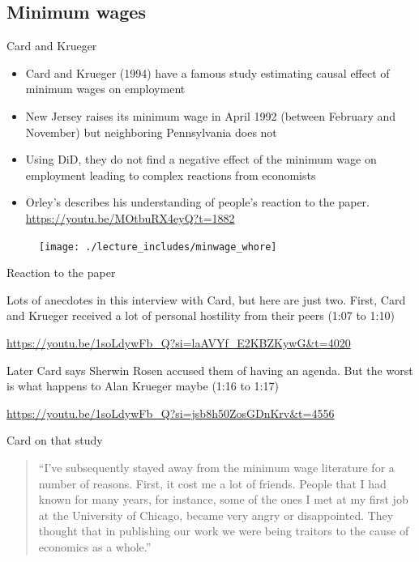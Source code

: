 \documentclass{beamer}
\begin{document}
\subsection{Minimum wages}


\begin{frame}{Card and Krueger}

\begin{itemize}
\item Card and Krueger (1994) have a famous study estimating causal effect of minimum wages on employment
\item  New Jersey raises its minimum wage in April 1992 (between February and November) but neighboring Pennsylvania does not
\item Using DiD, they do not find a negative effect of the minimum wage on employment leading to complex reactions from economists
\item Orley's describes his understanding of people's reaction to the paper.  \\ \url{https://youtu.be/MOtbuRX4eyQ?t=1882}
\end{itemize}

\end{frame}

\begin{frame}
	\begin{figure}
	\texttt{[image: ./lecture\_includes/minwage\_whore]}
	\end{figure}
\end{frame}


\begin{frame}{Reaction to the paper}


Lots of anecdotes in this interview with Card, but here are just two.  First, Card and Krueger received a lot of personal hostility from their peers (1:07 to 1:10)

\bigskip

\url{https://youtu.be/1soLdywFb_Q?si=laAVYf_E2KBZKywG&t=4020}

\bigskip

Later Card says Sherwin Rosen accused them of having an agenda.  But the worst is what happens to Alan Krueger maybe (1:16 to 1:17)

\bigskip

\url{https://youtu.be/1soLdywFb_Q?si=jsb8h50ZosGDnKrv&t=4556}




\end{frame}

\begin{frame}{Card on that study}

\begin{quote}
``I’ve subsequently stayed away from the minimum wage literature for a number of reasons. First, it cost me a lot of friends. People that I had known for many years, for instance, some of the ones I met at my first job at the University of Chicago, became very angry or disappointed. They thought that in publishing our work we were being traitors to the cause of economics as a whole.''
\end{quote}


\end{frame}
\end{document}
